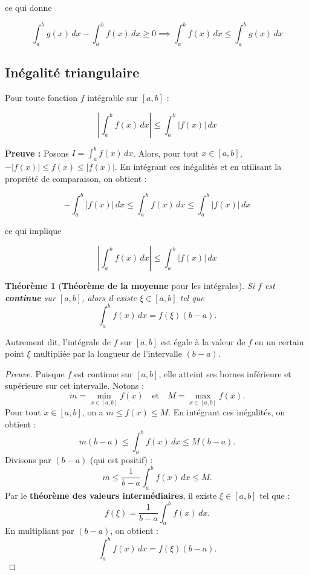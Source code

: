 \documentclass{report} %
\theoremstyle{definition}  %
\theoremstyle{plain} %
\newtheorem{theorem}{Théorème}[chapter]
\theoremstyle{remark} %
\begin{document}
\noindent
ce qui donne

\[
\int_a^b g(x) \, dx - \int_a^b f(x) \, dx \ge 0 \implies \int_a^b f(x) \, dx \le \int_a^b g(x) \, dx
\]

\subsection{Inégalité triangulaire}

Pour toute fonction \(f\) intégrable sur \([a,b]\) :

\[
\left| \int_a^b f(x)\,dx \right| \le \int_a^b |f(x)|\,dx
\]

\noindent
\textbf{Preuve :}  
Posons \(I = \int_a^b f(x)\,dx\). Alors, pour tout \(x \in [a,b]\), \(-|f(x)| \le f(x) \le |f(x)|\).  
En intégrant ces inégalités et en utilisant la propriété de comparaison, on obtient :

\[
-\int_a^b |f(x)|\,dx \le \int_a^b f(x)\,dx \le \int_a^b |f(x)|\,dx
\]

\noindent
ce qui implique

\[
\left| \int_a^b f(x)\,dx \right| \le \int_a^b |f(x)|\,dx
\]

\medskip

\begin{theorem}[\textbf{Théorème de la moyenne} pour les intégrales]
Si \( f \) est \textbf{continue} sur \([a, b]\), alors il existe \(\xi \in [a, b]\) tel que
\[
\int_a^b f(x) \, dx = f(\xi)(b - a).
\]
\end{theorem}

\medskip

\noindent
Autrement dit, l’intégrale de \( f \) sur \([a, b]\) est égale à la valeur de \( f \) en un certain point \(\xi\) multipliée par la longueur de l’intervalle \((b - a)\).

\medskip

\begin{proof}[Preuve]
Puisque \( f \) est continue sur \([a, b]\), elle atteint ses bornes inférieure et supérieure sur cet intervalle. Notons :
\[
m = \min_{x \in [a, b]} f(x) \quad \text{et} \quad M = \max_{x \in [a, b]} f(x).
\]
Pour tout \( x \in [a, b] \), on a \( m \leq f(x) \leq M \). En intégrant ces inégalités, on obtient :
\[
m(b - a) \leq \int_a^b f(x) \, dx \leq M(b - a).
\]
Divisons par \((b - a)\) (qui est positif) :
\[
m \leq \frac{1}{b - a} \int_a^b f(x) \, dx \leq M.
\]
Par le \textbf{théorème des valeurs intermédiaires}, il existe \(\xi \in [a, b]\) tel que :
\[
f(\xi) = \frac{1}{b - a} \int_a^b f(x) \, dx.
\]
En multipliant par \((b - a)\), on obtient :
\[
\int_a^b f(x) \, dx = f(\xi)(b - a).
\]
\end{proof}
\end{document}
